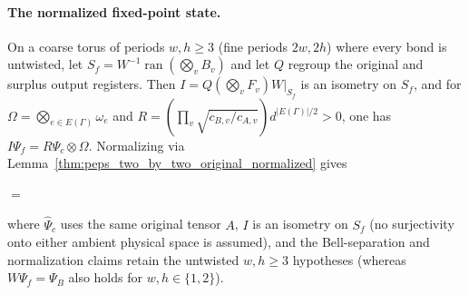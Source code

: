 \paragraph{The normalized fixed-point state.}
On a coarse torus of periods $w,h\geq3$ (fine periods
$2w,2h$) where every bond is untwisted, let $S_f=W^{-1}\operatorname{ran}(\bigotimes_v B_v)$ and let
$Q$ regroup the original and surplus output registers. Then
$I=Q(\bigotimes_vF_v)W|_{S_f}$ is an isometry on $S_f$, and for
$\Omega=\bigotimes_{e\in E(\Gamma)}\omega_e$ and
$R=(\prod_v\sqrt{c_{B,v}/c_{A,v}})d^{|E(\Gamma)|/2}>0$, one has
$I\Psi_f=R\Psi_c\otimes\Omega$. Normalizing via
Lemma~\ref{thm:peps_two_by_two_original_normalized} gives
\begin{tenkzequation}
    \tenkzkernel
    \begin{tenkz}[rows={wire}, cols=2, bonds=none]
    \end{tenkz}
    $=$
    \begin{tenkz}[rows={wire,wire,wire}, cols=1, bonds=none]
        \tn[at=2 s of fixedCoarse, name=fixedBell, skin=box,
            ports={0:physical:$\tau$}]{\Omega}
    \end{tenkz}
\end{tenkzequation}
where $\widehat\Psi_c$ uses the same original tensor $A$, $I$ is an isometry on
$S_f$ (no surjectivity onto either ambient physical space is assumed),
and the Bell-separation and normalization claims retain the untwisted
$w,h\geq3$ hypotheses (whereas $W\Psi_f=\Psi_B$ also holds for $w,h\in\{1,2\}$).
